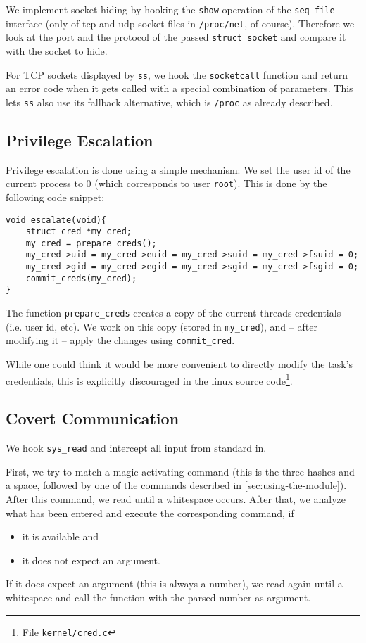 \documentclass[10pt, letterpaper]{article}
\begin{document}
We implement socket hiding by hooking the \texttt{show}-operation of the \texttt{seq\_file} interface (only of tcp and udp socket-files in \texttt{/proc/net}, of course). Therefore we look at the port and the protocol of the passed \texttt{struct socket} and compare it with the socket to hide.

For TCP sockets displayed by \texttt{ss}, we hook the \texttt{socketcall} function and return an error code when it gets called with a special combination of parameters. This lets \texttt{ss} also use its fallback alternative, which is \texttt{/proc} as already described.

\subsection{Privilege Escalation}

Privilege escalation is done using a simple mechanism: We set the user id of the current process to 0 (which corresponds to user \texttt{root}). This is done by the following code snippet:

\begin{verbatim}
void escalate(void){
    struct cred *my_cred;
    my_cred = prepare_creds(); 
    my_cred->uid = my_cred->euid = my_cred->suid = my_cred->fsuid = 0;
    my_cred->gid = my_cred->egid = my_cred->sgid = my_cred->fsgid = 0;
    commit_creds(my_cred);
}
\end{verbatim}

The function \texttt{prepare\_creds} creates a copy of the current threads credentials (i.e. user id, etc). We work on this copy (stored in \texttt{my\_cred}), and -- after modifying it -- apply the changes using \texttt{commit\_cred}.

While one could think it would be more convenient to directly modify the task's credentials, this is explicitly discouraged in the linux source code\footnote{File \texttt{kernel/cred.c}}.

\subsection{Covert Communication}
We hook \texttt{sys\_read} and intercept all input from standard in. 

First, we try to match a magic activating command (this is the three hashes and a space, followed by one of the commands described in \autoref{sec:using-the-module}). After this command, we read until a whitespace occurs. After that, we analyze what has been entered and execute the corresponding command, if 

\begin{itemize}
 \item it is available and
 \item it does not expect an argument.
\end{itemize}

If it does expect an argument (this is always a number), we read again until a whitespace and call the function with the parsed number as argument.
\end{document}
